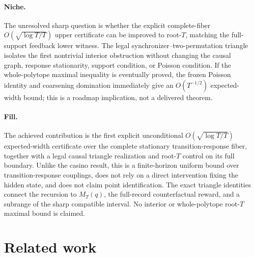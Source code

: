 \documentclass{article}
\begin{document}
\paragraph{Niche.} The unresolved sharp question is whether the explicit complete-fiber \(O(\sqrt{\log T/T})\) upper certificate can be improved to root-\(T\), matching the full-support feedback lower witness. The legal synchronizer--two-permutation triangle isolates the first nontrivial interior obstruction without changing the causal graph, response stationarity, support condition, or Poisson condition. If the whole-polytope maximal inequality is eventually proved, the frozen Poisson identity and coarsening domination immediately give an \(O(T^{-1/2})\) expected-width bound; this is a roadmap implication, not a delivered theorem.

\paragraph{Fill.} The achieved contribution is the first explicit unconditional \(O(\sqrt{\log T/T})\) expected-width certificate over the complete stationary transition-response fiber, together with a legal causal triangle realization and root-\(T\) control on its full boundary. Unlike the casino result, this is a finite-horizon uniform bound over transition-response couplings, does not rely on a direct intervention fixing the hidden state, and does not claim point identification. The exact triangle identities connect the recursion to \(M_T(q)\), the full-record counterfactual reward, and a subrange of the sharp compatible interval. No interior or whole-polytope root-\(T\) maximal bound is claimed.

\section{Related work}
\end{document}
